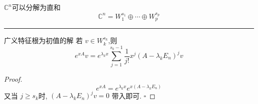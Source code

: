 \documentclass[lang=cn,12pt,color=green,fontset=none]{elegantbook}
\begin{document}
\(  \mathbb{C}^{n}  \)可以分解为直和 \[
\mathbb{C}^{n} = W_1^{s_1}\oplus \cdots \oplus W_{p}^{s_{p}}
\] 


\hspace*{\fill} 
\hrule
\hspace*{\fill}

\begin{proposition}{广义特征根为初值的解}
    若 \(  v\in W_{k}^{s_{k}}  \),则 \[
    e^{xA}v=e^{ \lambda _{k}x}\sum _{j=1}^{s_{k}-1} \frac{1}{j!} x^{j}\left( A- \lambda _{k}E_{n} \right)^{j}v 
    \] 
\end{proposition}

\begin{proof}
    \[
    e^{xA}=e^{ \lambda _{k}x}e^{x\left( A- \lambda _{k}E_{n} \right) }
    \]又当 \(  j \ge s_{k}  \)时, \(  \left( A- \lambda _{k}E_{n} \right)^{j}v=0   \)  
    带入即可.
    \hfill $\square$
\end{proof}
\end{document}
